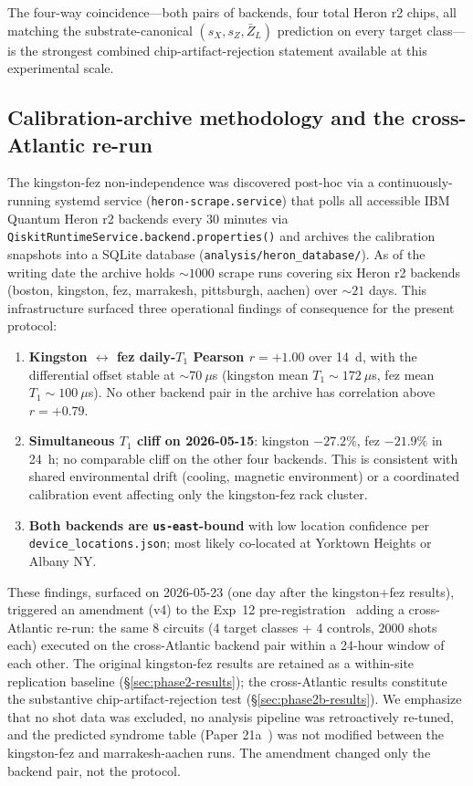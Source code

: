 \documentclass[11pt]{article}
\begin{document}
The four-way coincidence---both pairs of backends, four total Heron r2 chips, all matching the substrate-canonical $(s_X, s_Z, \bar Z_L)$ prediction on every target class---is the strongest combined chip-artifact-rejection statement available at this experimental scale.

\subsection{Calibration-archive methodology and the cross-Atlantic re-run}
\label{sec:cross-backend-methodology}

The kingston-fez non-independence was discovered post-hoc via a continuously-running systemd service (\texttt{heron-scrape.service}) that polls all accessible IBM Quantum Heron r2 backends every $30$ minutes via \texttt{QiskitRuntimeService.backend.properties()} and archives the calibration snapshots into a SQLite database (\texttt{analysis/heron\_database/}).  As of the writing date the archive holds $\sim 1000$ scrape runs covering six Heron r2 backends (boston, kingston, fez, marrakesh, pittsburgh, aachen) over $\sim 21$ days.  This infrastructure surfaced three operational findings of consequence for the present protocol:

\begin{enumerate}
\item \textbf{Kingston $\leftrightarrow$ fez daily-$T_1$ Pearson $r = +1.00$} over 14~d, with the differential offset stable at $\sim 70~\mu$s (kingston mean $T_1 \sim 172~\mu$s, fez mean $T_1 \sim 100~\mu$s).  No other backend pair in the archive has correlation above $r = +0.79$.
\item \textbf{Simultaneous $T_1$ cliff on 2026-05-15}: kingston $-27.2\%$, fez $-21.9\%$ in 24~h; no comparable cliff on the other four backends.  This is consistent with shared environmental drift (cooling, magnetic environment) or a coordinated calibration event affecting only the kingston-fez rack cluster.
\item \textbf{Both backends are \texttt{us-east}-bound} with low location confidence per \texttt{device\_locations.json}; most likely co-located at Yorktown Heights or Albany NY.
\end{enumerate}

These findings, surfaced on 2026-05-23 (one day after the kingston+fez results), triggered an amendment (v4) to the Exp~12 pre-registration~\cite{Exp12Prereg} adding a cross-Atlantic re-run: the same 8 circuits (4 target classes + 4 controls, $2000$ shots each) executed on the cross-Atlantic backend pair within a 24-hour window of each other.  The original kingston-fez results are retained as a within-site replication baseline (\S\ref{sec:phase2-results}); the cross-Atlantic results constitute the substantive chip-artifact-rejection test (\S\ref{sec:phase2b-results}).  We emphasize that no shot data was excluded, no analysis pipeline was retroactively re-tuned, and the predicted syndrome table (Paper 21a~\cite[Table 4]{Paper21a}) was not modified between the kingston-fez and marrakesh-aachen runs.  The amendment changed only the backend pair, not the protocol.
\end{document}
